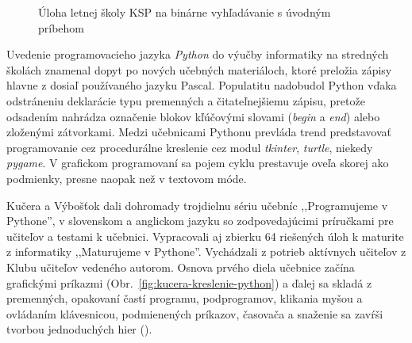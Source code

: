 \begin{figure}[h]
\centering
{}
\caption{Úloha letnej školy KSP na binárne vyhľadávanie s úvodným príbehom}
\label{fig:ksp-oblecenie}
\end{figure}

Uvedenie programovacieho jazyka \emph{Python} do výučby informatiky na stredných školách znamenal dopyt po nových učebných materiáloch, ktoré preložia zápisy hlavne z dosiaľ používaného jazyku Pascal. Populatitu nadobudol Python vďaka odstráneniu deklarácie typu premenných a čitateľnejšiemu zápisu, pretože odsadením nahrádza označenie blokov kľúčovými slovami (\emph{begin} a \emph{end}) alebo zloženými zátvorkami. Medzi učebnicami Pythonu prevláda trend predstavovať programovanie cez procedurálne kreslenie cez modul \emph{tkinter}, \emph{turtle}, niekedy \emph{pygame}. V grafickom programovaní sa pojem cyklu prestavuje oveľa skorej ako podmienky, presne naopak než v textovom móde.

Kučera a Výbošťok dali dohromady trojdielnu sériu učebníc ,,Programujeme v Pythone'', v slovenskom a anglickom jazyku so zodpovedajúcimi príručkami pre učiteľov a testami k učebnici. Vypracovali aj zbierku 64 riešených úloh k maturite z informatiky ,,Maturujeme v Pythone''. Vychádzali z potrieb aktívnych učiteľov z Klubu učiteľov vedeného autorom. Osnova prvého diela učebnice začína grafickými príkazmi (Obr.~\ref{fig:kucera-kreslenie-python}) a ďalej sa skladá z premenných, opakovaní častí programu, podprogramov, klikania myšou a ovládaním klávesnicou, podmienených príkazov, časovača a snaženie sa zavŕši tvorbou jednoduchých hier (\cite{kucera_programujeme_2016}). 

